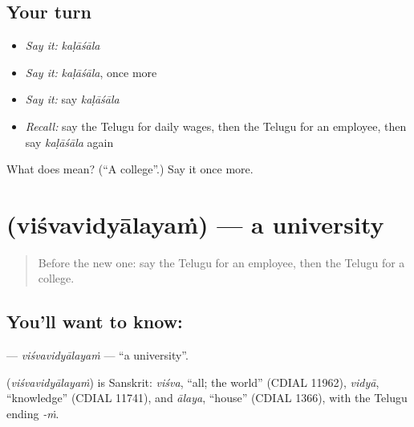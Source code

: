 \subsection*{Your turn}
\begin{itemize}
\raggedright
  \item \emph{Say it:} \emph{kaḷāśāla}
  \item \emph{Say it:} \emph{kaḷāśāla}, once more
  \item \emph{Say it:} say \emph{kaḷāśāla}
  \item \emph{Recall:} say the Telugu for daily wages, then the Telugu for an employee, then say \emph{kaḷāśāla} again
\end{itemize}

\begin{tcolorbox}[breakable,colback=teal!4,colframe=teal!35!black,title={Before you move on}]
What does  mean? (\textquotedblleft{}A college\textquotedblright{}.) Say it once more.
\end{tcolorbox}
\section[\texorpdfstring{\te{విశ్వవిద్యాలయం} (viśvavidyālayaṁ)}{విశ్వవిద్యాలయం (viśvavidyālayaṁ)}]{ (viśvavidyālayaṁ) — a university}

\label{lesson:TE-C311-visvavidyalayam}



\begin{quote}
Before the new one: say the Telugu for an employee, then the Telugu for a college.
\end{quote}

\subsection*{You'll want to know: }
\textbf{} — \emph{viśvavidyālayaṁ} — \textquotedblleft{}a university\textquotedblright{}.

\begin{cousinweb}
\textbf{} (\emph{viśvavidyālayaṁ}) is Sanskrit: \emph{viśva}, \textquotedblleft{}all; the world\textquotedblright{} (CDIAL 11962), \emph{vidyā}, \textquotedblleft{}knowledge\textquotedblright{} (CDIAL 11741), and \emph{ālaya}, \textquotedblleft{}house\textquotedblright{} (CDIAL 1366), with the Telugu ending \emph{-ṁ}.
\end{cousinweb}

